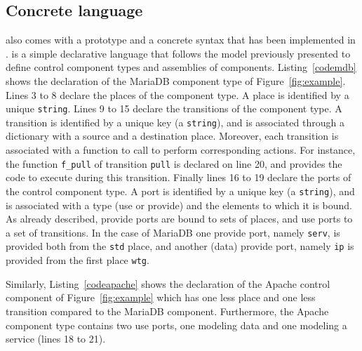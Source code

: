 
\subsection{Concrete language}

\mad also comes with a prototype and a concrete syntax that has been
implemented in \python. \mad is a simple declarative language that
follows the model previously presented to define control component
types and assemblies of components. Listing~\ref{codemdb} shows the
declaration of the MariaDB component type of
Figure~\ref{fig:example}. Lines 3 to 8 declare the places of the
component type. A place is identified by a unique
\texttt{string}. Lines 9 to 15 declare the transitions of the
component type. A transition is identified by a unique key (a
\texttt{string}), and is associated through a dictionary with a source
and a destination place. Moreover, each transition is associated with
a function to call to perform corresponding actions. For instance, the
function \texttt{f\_pull} of transition \texttt{pull} is declared on
line 20, and provides the code to execute during this
transition. Finally lines 16 to 19 declare the ports of the control
component type. A port is identified by a unique key (a
\texttt{string}), and is associated with a type (use or provide) and
the elements to which it is bound. As already described, provide ports
are bound to sets of places, and use ports to a set of transitions. In
the case of MariaDB one provide port, namely \texttt{serv}, is
provided both from the \texttt{std} place, and another (data) provide
port, namely \texttt{ip} is provided from the first place
\texttt{wtg}.



Similarly, Listing~\ref{codeapache} shows the declaration of the
Apache control component of Figure~\ref{fig:example} which has one
less place and one less transition compared to the MariaDB
component. Furthermore, the Apache component type contains two use
ports, one modeling data and one modeling a service (lines 18 to 21).

